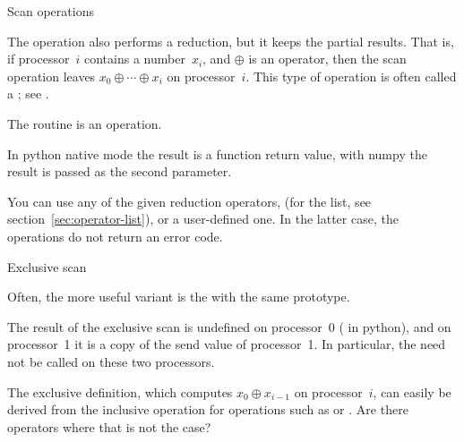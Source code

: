 
 {Scan operations}
\label{sec:scan}

The  operation also performs a reduction, but it keeps 
the partial results. That is, if processor~$i$ contains a number~$x_i$, 
and $\oplus$ is an operator,
then the scan operation leaves $x_0\oplus\cdots\oplus x_i$ on processor~$i$.
This type of operation is often called a ;
see .

The  routine is an  operation.


In python native mode the result is a function return value,
with numpy the result is passed as the second parameter.
%

You can use any of the given reduction operators,
  (for the list, see section~\ref{sec:operator-list}),
or a user-defined one. In the latter case,
the  operations do not return an error code.

 {Exclusive scan}

Often, the more useful variant is the 
%
%
with the same prototype. 

The result of the exclusive scan is undefined on processor~0
( in python),
and on processor~1 it is a copy of the send value of processor~1.
In particular, the  need not be called on these two 
processors.

\begin{exercise}
  The exclusive definition, which computes $x_0\oplus x_{i-1}$ on
  processor~$i$, can easily be derived from the inclusive operation
  for operations such as  or
  .  Are there operators where that is not the
  case?
\end{exercise}


